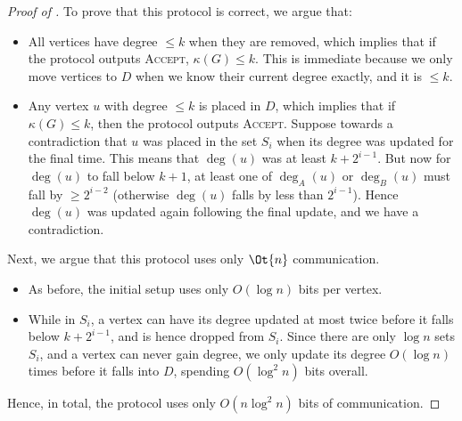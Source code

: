 \documentclass[11pt,letterpaper]{article}
\renewcommand{\geq}{\geqslant}
\renewcommand{\leq}{\leqslant}
\theoremstyle{definition}
\newcommand{\true}{\textsc{Accept}}
\begin{document}
\begin{proof}[Proof of ]
To prove that this protocol is correct, we argue that:
\begin{itemize}
  \item All vertices have degree $\leq k$ when they are removed, which
    implies that if the protocol outputs \true{}, $\kappa(G) \leq k$.
    This is immediate because we only move vertices to $D$ when we know their
    current degree exactly, and it is $\leq k$.
  \item Any vertex $u$ with degree $\leq k$ is placed in $D$, which implies
    that if $\kappa(G) \leq k$, then the protocol outputs \true{}.
    Suppose towards a contradiction that $u$ was placed in the set $S_i$ when
    its degree was updated for the final time.
    This means that $\deg(u)$ was at least $k + 2^{i - 1}$.
    But now for $\deg(u)$ to fall below $k + 1$, at least one of $\deg_A(u)$
    or $\deg_B(u)$ must fall by $\geq 2^{i - 2}$ (otherwise $\deg(u)$ falls by
    less than $2^{i - 1}$).
    Hence $\deg(u)$ was updated again following the final update, and we have
    a contradiction.
\end{itemize}

Next, we argue that this protocol uses only $\Ot{n}$ communication.
\begin{itemize}
  \item As before, the initial setup uses only $O(\log n)$ bits per vertex.
  \item While in $S_i$, a vertex can have its degree updated at most twice
    before it falls below $k + 2^{i - 1}$, and is hence dropped from
    $S_i$.
    Since there are only $\log n$ sets $S_i$, and a vertex can never gain
    degree, we only update its degree $O(\log n)$ times before it falls into $D$,
    spending $O( \log^2 n )$ bits overall.
\end{itemize}
Hence, in total, the protocol uses only $O(n \log^2 n)$ bits of communication.
\end{proof}
\end{document}

